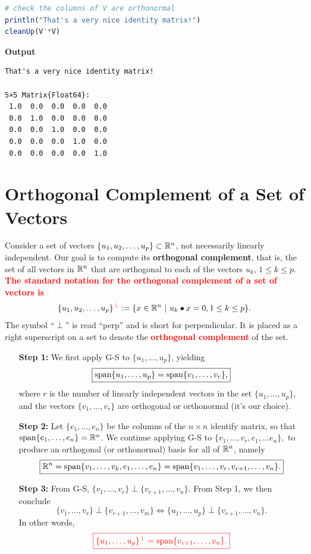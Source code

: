 \begin{lstlisting}[language=Julia,style=mystyle]
# check the columns of V are orthonormal
println("That's a very nice identity matrix!")
cleanUp(V'*V)
\end{lstlisting}
\textbf{Output} 
\begin{verbatim}
That's a very nice identity matrix!

5×5 Matrix{Float64}:
 1.0  0.0  0.0  0.0  0.0
 0.0  1.0  0.0  0.0  0.0
 0.0  0.0  1.0  0.0  0.0
 0.0  0.0  0.0  1.0  0.0
 0.0  0.0  0.0  0.0  1.0
\end{verbatim}

\section{Orthogonal Complement of a Set of Vectors}

Consider a set of vectors $\{u_1, u_2, \ldots, u_p  \} \subset \mathbb R^n$, not necessarily linearly independent. Our goal is to compute its \textbf{orthogonal complement}, that is, the set of all vectors in $\mathbb R^n$ that are orthogonal to each of the vectors $u_k$, $1\le k \le p$. \textcolor{red}{\bf The standard notation for the orthogonal complement of a set of vectors is}
$$\{u_1, u_2, \ldots, u_p  \}^{ \color{red} \mathbf {\perp} } := \{x\in \mathbb R^n~|~ u_k \bullet x = 0, 1\le k \le p  \}. $$
The symbol ``$\perp$'' is read ``perp'' and is short for perpendicular. It is placed as a right superscript on a set to denote the \textcolor{red}{\bf orthogonal complement} of the set.

\begin{enumerate}
    \item[\textbf{Step 1:}] We first apply G-S to $\{u_1, \ldots,  u_p \}$, yielding
$$\boxed{\mathrm{span} \{  u_1, \ldots,  u_p  \} = \mathrm{span} \{ v_1, \ldots,v_r \},}$$
where $r$ is the number of linearly independent vectors in the set $\{u_1, \ldots,  u_p\}$, and the vectors  $\{ v_1, \ldots,v_r \}$ are orthogonal or orthonormal (it's our choice). 

\item[\textbf{Step 2:}] Let $\{e_1, \ldots, e_n\}$ be the columns of the $n \times n$ identify matrix, so that $\mathrm{span} \{ e_1, \ldots, e_n \} = \mathbb R^n$. We continue applying G-S to 
$ \{ v_1, \ldots,v_r, e_1, \ldots e_n  \},$
to produce an orthogonal (or orthonormal) basis for all of $\mathbb R^n$, namely
$$\boxed{\mathbb R^n = \mathrm{span} \{ v_1, \ldots,  v_k, e_1, \ldots, e_n  \} = \mathrm{span} \{ v_1, \ldots,v_r, v_{r+1}, \ldots, v_n \}.}$$

\item[\textbf{Step 3:}] From G-S, $\{v_1, \ldots,  v_r\} \perp \{ v_{r+1}, \ldots, v_n\}$. From Step 1, we then conclude
$$\{v_1, \ldots,  v_r\} \perp \{ v_{r+1}, \ldots, v_m\}  \iff  \{u_1, \ldots, u_p\} \perp \{ v_{r+1}, \ldots, v_n\}.$$
In other words, 
$$\color{red} \boxed{ \{u_1, \ldots, u_p\}^\perp = \mathrm{span} \{ v_{r+1}, \ldots, v_n \}.  } $$
\end{enumerate}

